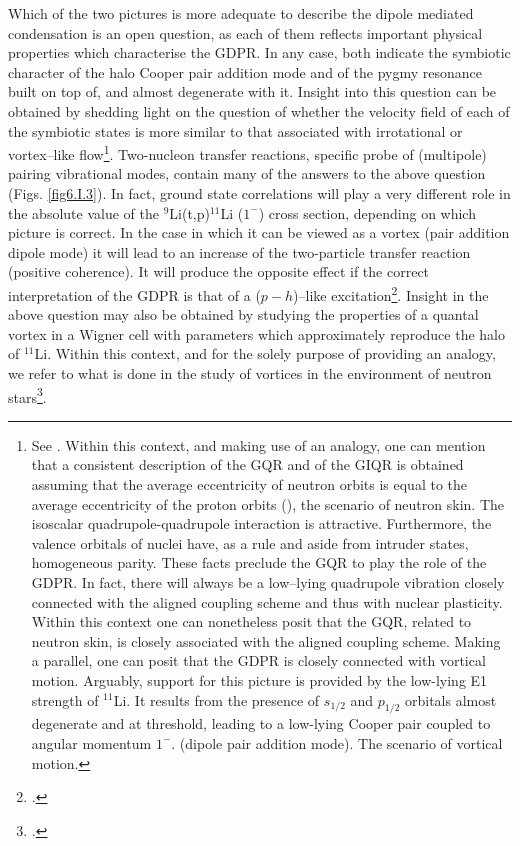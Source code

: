 \begin{subappendices}
Which of the two  pictures is more adequate to describe  the dipole mediated condensation is an open question,  
as each of them reflects  important physical properties which   characterise  the GDPR. In any case, both indicate the symbiotic character  of the halo Cooper pair  addition mode  and of the pygmy resonance  built on top of, and almost degenerate with it. 
Insight into this question can be obtained  by shedding light on the question  of whether  the velocity field of each of the symbiotic  states is more similar  to that associated  with irrotational or vortex--like flow\footnote{See \cite{Repko:13}. Within this context, and making use of an analogy, one can  mention that a consistent description of the GQR and of the GIQR is obtained 
assuming that the average eccentricity of neutron orbits 
is equal to the average eccentricity of the proton orbits (\cite{Bes:75c}), the scenario of neutron skin.
The  isoscalar quadrupole-quadrupole interaction is attractive. Furthermore, 
the valence orbitals of nuclei have, as a rule and aside from intruder states, homogeneous parity. These facts  preclude 
the GQR to play the role of the GDPR. In fact, there will always be a low--lying quadrupole vibration closely 
connected with the aligned coupling scheme and thus  with nuclear plasticity. Within this context one can  nonetheless  posit  that the GQR, related to neutron skin,  is closely associated with the aligned coupling scheme.
Making a parallel, one can posit  that the GDPR is closely connected with vortical motion. 
Arguably,  support for this picture is provided by the   low-lying  E1 
strength of $^{11}$Li. It  results from the presence of $s_{1/2}$ and $p_{1/2}$ orbitals almost degenerate and at threshold, 
leading to a low-lying Cooper pair coupled to angular momentum $1^-$. (dipole pair addition mode). 
The  scenario of vortical motion. }. Two-nucleon transfer reactions, specific probe  of (multipole) pairing vibrational modes, contain many of the answers to the above question (Figs. \ref{fig6.I.3}). 
In fact,  ground state correlations will play a very different role in the absolute value of the $^9$Li(t,p)$^{11}$Li ($1^-$) cross section,
depending  on which picture is correct. In the case in which 
it can be 
 viewed as a vortex (pair addition dipole mode) it will lead to an increase of the two-particle transfer reaction 
 (positive coherence).
 It will  produce the opposite effect if the correct interpretation of the GDPR   is that of a 
($p-h$)--like excitation\footnote{ \cite{Broglia:71}.}. 
Insight  in the above question may also be obtained by studying  the properties of
a quantal vortex in a Wigner cell with parameters which approximately reproduce 
the halo of $^{11}$Li. Within this context, and  for the solely purpose of providing an analogy, we refer 
to what is done in the study of vortices in the environment of neutron stars\footnote{\cite{Avogadro:07,Avogadro:08}.}.


\end{subappendices}
